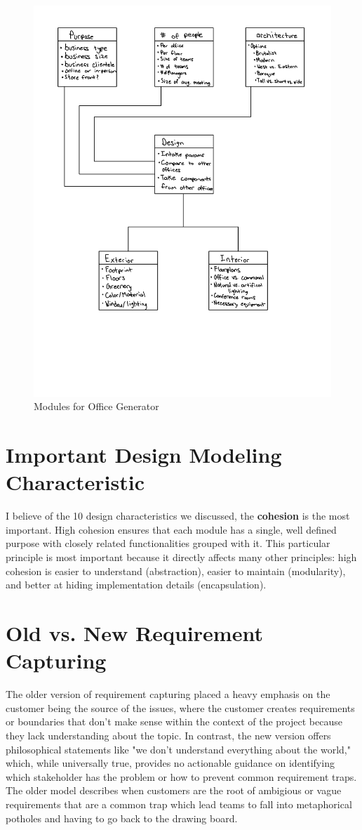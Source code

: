 \documentclass[12pt]{article}
\begin{document}
\begin{figure}[H]
    \centering
    \includegraphics[width=0.75\linewidth]{images/HW3.pdf}
    \caption{Modules for Office Generator}
    \label{fig:officegenerator}
\end{figure}

\section{Important Design Modeling Characteristic}

I believe of the 10 design characteristics we discussed, the \textbf{cohesion} is the most important. High cohesion ensures that
each module has a single, well defined purpose with closely related functionalities grouped with it. This particular principle is
most important because it directly affects many other principles: high cohesion is easier to understand (abstraction),
easier to maintain (modularity), and better at hiding implementation details (encapsulation).
\section{Old vs. New Requirement Capturing}

The older version of requirement capturing placed a heavy emphasis on the customer being the source of the issues, where the customer creates requirements 
or boundaries that don't make sense within the context of the project because they lack understanding about the topic. In contrast, the new version offers philosophical statements like "we don't understand everything about the world," 
which, while universally true, provides no actionable guidance on identifying which stakeholder has the problem or how to prevent common requirement traps.
The older model describes when customers are the root of ambigious or vague requirements that are a common trap which lead teams to fall into metaphorical potholes and having to go back to the drawing board. 
\end{document}
